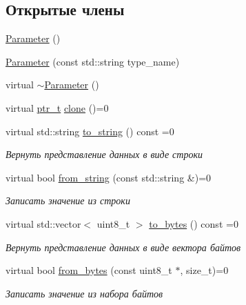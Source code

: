 \subsection*{Открытые члены}
\begin{DoxyCompactItemize}
\item 
\hyperlink{classLIBKMS__namespace_1_1Parameter_ac767db81c6aa9e552089be5958bfc81f}{Parameter} ()
\item 
\hyperlink{classLIBKMS__namespace_1_1Parameter_a3c0c7c0222fbe9d6d38e002e706cf1b7}{Parameter} (const std\-::string type\-\_\-name)
\item 
virtual \hyperlink{classLIBKMS__namespace_1_1Parameter_a644c4a3c66079510847da3377e5f1594}{$\sim$\-Parameter} ()
\item 
virtual \hyperlink{classLIBKMS__namespace_1_1Parameter_a28516bcd5bad5857b2d1c676e4176f51}{ptr\-\_\-t} \hyperlink{classLIBKMS__namespace_1_1Parameter_a2b360aeb7f850d4fccc58adc4a5b88b7}{clone} ()=0
\item 
virtual std\-::string \hyperlink{classLIBKMS__namespace_1_1Parameter_ad934454e1569e546f6f347bb03ce705f}{to\-\_\-string} () const =0
\begin{DoxyCompactList}\small\item\em Вернуть представление данных в виде строки \end{DoxyCompactList}\item 
virtual bool \hyperlink{classLIBKMS__namespace_1_1Parameter_a6da649d3045e979a488c336bf77b411b}{from\-\_\-string} (const std\-::string \&)=0
\begin{DoxyCompactList}\small\item\em Записать значение из строки \end{DoxyCompactList}\item 
virtual std\-::vector$<$ uint8\-\_\-t $>$ \hyperlink{classLIBKMS__namespace_1_1Parameter_a6ebf9bc6aaa62d78f786bc6368a2c65a}{to\-\_\-bytes} () const =0
\begin{DoxyCompactList}\small\item\em Вернуть представление данных в виде вектора байтов \end{DoxyCompactList}\item 
virtual bool \hyperlink{classLIBKMS__namespace_1_1Parameter_a33a7dac4680f0e39c9166771c65971ab}{from\-\_\-bytes} (const uint8\-\_\-t $\ast$, size\-\_\-t)=0
\begin{DoxyCompactList}\small\item\em Записать значение из набора байтов \end{DoxyCompactList}\item 

\end{DoxyCompactItemize}
